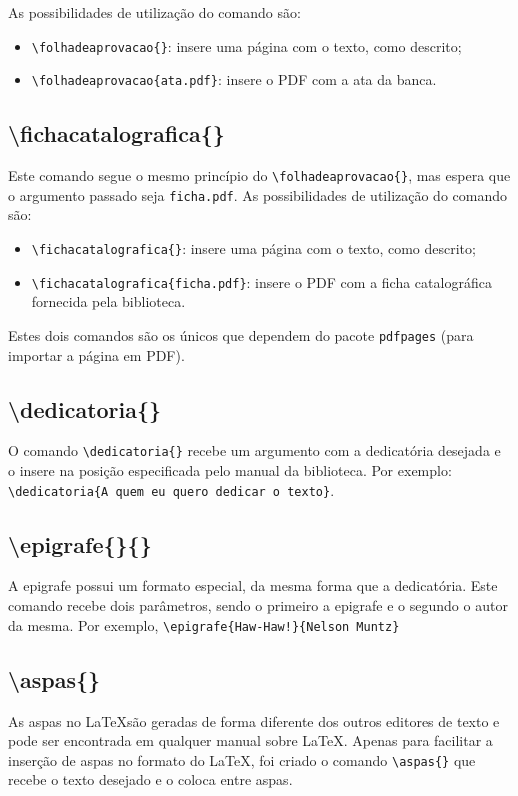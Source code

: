 \documentclass{fei}
\begin{document}
    As possibilidades de utilização do comando são:
    \begin{itemize}
        \item \verb+\folhadeaprovacao{}+: insere uma página com o texto, como descrito;
        \item \verb+\folhadeaprovacao{ata.pdf}+: insere o PDF com a ata da banca.
    \end{itemize}
    
    
    \subsection{\textbackslash fichacatalografica\{\}}
    Este comando segue o mesmo princípio do \verb+\folhadeaprovacao{}+, mas espera que o argumento passado seja \texttt{ficha.pdf}. As possibilidades de utilização do comando são:
    \begin{itemize}
        \item \verb+\fichacatalografica{}+: insere uma página com o texto, como descrito;
        \item \verb+\fichacatalografica{ficha.pdf}+: insere o PDF com a ficha catalográfica fornecida pela biblioteca.
    \end{itemize}
 
 Estes dois comandos são os únicos que dependem do pacote \texttt{pdfpages} (para importar a página em PDF).

    \subsection{\textbackslash dedicatoria\{\}}
    O comando \verb+\dedicatoria{}+ recebe um argumento com a dedicatória desejada e o insere na posição especificada pelo manual da biblioteca. Por exemplo: \\ \verb+\dedicatoria{A quem eu quero dedicar o texto}+.
    
    \subsection{\textbackslash epigrafe\{\}\{\}}
    A epigrafe possui um formato especial, da mesma forma que a dedicatória. Este comando recebe dois parâmetros, sendo o primeiro a epigrafe e o segundo o autor da mesma. Por exemplo, \verb+\epigrafe{Haw-Haw!}{Nelson Muntz}+
    
    \subsection{\textbackslash aspas\{\}}
    As aspas no \LaTeX são geradas de forma diferente dos outros editores de texto e pode ser encontrada em qualquer manual sobre \LaTeX. Apenas para facilitar a inserção de aspas no formato do \LaTeX, foi criado o comando \verb+\aspas{}+ que recebe o texto desejado e o coloca entre aspas.
\end{document}
